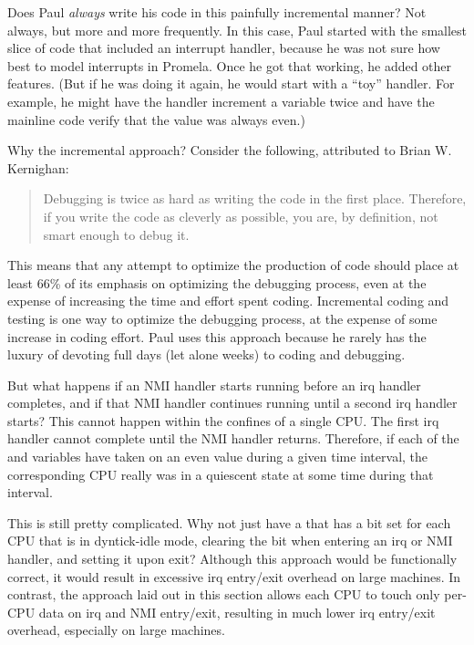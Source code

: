 \begin{enumerate}
\QuickQ{}
	Does Paul \emph{always} write his code in this painfully incremental
	manner?
\QuickA{}
	Not always, but more and more frequently.
	In this case, Paul started with the smallest slice of code that
	included an interrupt handler, because he was not sure how best
	to model interrupts in Promela.
	Once he got that working, he added other features.
	(But if he was doing it again, he would start with a ``toy'' handler.
	For example, he might have the handler increment a variable twice and
	have the mainline code verify that the value was always even.)

	Why the incremental approach?
	Consider the following, attributed to Brian W. Kernighan:

	\begin{quote}
		Debugging is twice as hard as writing the code in the first
		place. Therefore, if you write the code as cleverly as possible,
		you are, by definition, not smart enough to debug it.
	\end{quote}

	This means that any attempt to optimize the production of code should
	place at least 66\% of its emphasis on optimizing the debugging process,
	even at the expense of increasing the time and effort spent coding.
	Incremental coding and testing is one way to optimize the debugging
	process, at the expense of some increase in coding effort.
	Paul uses this approach because he rarely has the luxury of
	devoting full days (let alone weeks) to coding and debugging.

\QuickQ{}
	But what happens if an NMI handler starts running before
	an irq handler completes, and if that NMI handler continues
	running until a second irq handler starts?
\QuickA{}
	This cannot happen within the confines of a single CPU.
	The first irq handler cannot complete until the NMI handler
	returns.
	Therefore, if each of the  and 
	variables have taken on an even value during a given time
	interval, the corresponding CPU really was in a quiescent
	state at some time during that interval.

\QuickQ{}
	This is still pretty complicated.
	Why not just have a  that has a bit set for
	each CPU that is in dyntick-idle mode, clearing the bit
	when entering an irq or NMI handler, and setting it upon
	exit?
\QuickA{}
	Although this approach would be functionally correct, it
	would result in excessive irq entry/exit overhead on
	large machines.
	In contrast, the approach laid out in this section allows
	each CPU to touch only per-CPU data on irq and NMI entry/exit,
	resulting in much lower irq entry/exit overhead, especially
	on large machines.


\end{enumerate}
